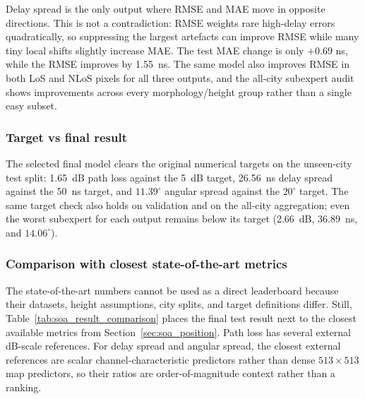 Delay spread is the only output where RMSE and MAE move in opposite directions.
This is not a contradiction: RMSE weights rare high-delay errors quadratically,
so suppressing the largest artefacts can improve RMSE while many tiny local
shifts slightly increase MAE. The test MAE change is only \(+0.69\) ns, while
the RMSE improves by \SI{1.55}{ns}. The same model also improves RMSE in both
LoS and NLoS pixels for all three outputs, and the all-city subexpert audit
shows improvements across every morphology/height group rather than a single
easy subset.

\subsubsection*{Target vs final result}

The selected final model clears the original numerical targets on the unseen-city
test split: \SI{1.65}{dB} path loss against the \SI{5}{dB} target,
\SI{26.56}{ns} delay spread against the \SI{50}{ns} target, and
\(11.39^\circ\) angular spread against the \(20^\circ\) target. The same
target check also holds on validation and on the all-city aggregation; even
the worst subexpert for each output remains below its target
(\SI{2.66}{dB}, \SI{36.89}{ns}, and \(14.06^\circ\)).

\subsubsection*{Comparison with closest state-of-the-art metrics}

The state-of-the-art numbers cannot be used as a direct leaderboard because
their datasets, height assumptions, city splits, and target definitions differ.
Still, Table~\ref{tab:soa_result_comparison} places the final test result next
to the closest available metrics from Section~\ref{sec:soa_position}. Path
loss has several external dB-scale references. For delay spread and angular
spread, the closest external references are scalar channel-characteristic
predictors rather than dense \(513\times513\) map predictors, so their ratios
are order-of-magnitude context rather than a ranking.

